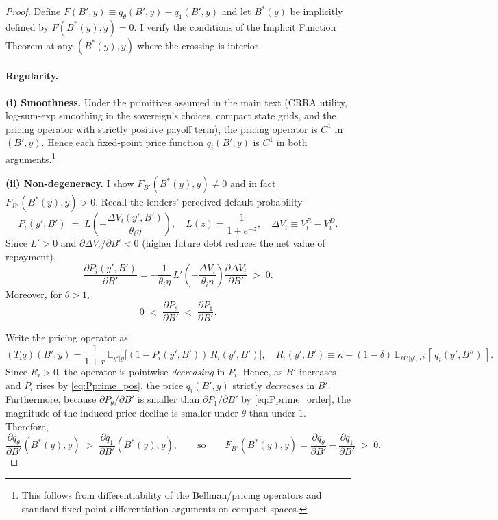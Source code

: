 \documentclass[12pt]{article}
\theoremstyle{plain}
\newcommand{\E}{\mathbb{E}}
\begin{document}
\begin{proof}
	Define \(F(B',y)\equiv q_\theta(B',y)-q_1(B',y)\) and let \(B^*(y)\) be implicitly defined by \(F(B^*(y),y)=0\).
	I verify the conditions of the Implicit Function Theorem at any \((B^*(y),y)\) where the crossing is interior.

	\paragraph{Regularity.}
	\textbf{(i) Smoothness.} Under the primitives assumed in the main text (CRRA utility, log-sum-exp smoothing in the sovereign’s choices, compact state grids, and the pricing operator with strictly positive payoff term), the pricing operator is \(C^1\) in \((B',y)\). Hence each fixed-point price function \(q_i(B',y)\) is \(C^1\) in both arguments.\footnote{This follows from differentiability of the Bellman/pricing operators and standard fixed-point differentiation arguments on compact spaces.}

\textbf{(ii) Non-degeneracy.} I show \(F_{B'}(B^*(y),y)\neq 0\) and in fact \(F_{B'}(B^*(y),y)>0\).
	Recall the lenders’ perceived default probability
	\[
		P_i(y',B') \;=\; L\!\left(-\frac{\Delta V_i(y',B')}{\theta_i\eta}\right),
		\quad L(z)=\frac{1}{1+e^{-z}},\quad
		\Delta V_i \equiv V_i^R - V_i^D.
	\]
	Since \(L'>0\) and \(\partial\Delta V_i/\partial B' < 0\) (higher future debt
	reduces the net value of repayment),
	\begin{equation}
		\frac{\partial P_i(y',B')}{\partial B'}
		= -\frac{1}{\theta_i\eta}\,L'\!\left(-\frac{\Delta V_i}{\theta_i\eta}\right)\frac{\partial \Delta V_i}{\partial B'} \;>\; 0.
		\label{eq:Pprime_pos}
	\end{equation}
	Moreover, for \(\theta>1\),
	\begin{equation}
		0 \;<\; \frac{\partial P_\theta}{\partial B'} \;<\; \frac{\partial P_1}{\partial B'}.
		\label{eq:Pprime_order}
	\end{equation}

	Write the pricing operator as
	\[
		(T_i q)(B',y)=\frac{1}{1+r}\,\E_{y'|y}\!\Big[(1-P_i(y',B'))\,R_i(y',B')\Big],\quad
		R_i(y',B')\equiv \kappa+(1-\delta)\,\E_{B''|y',B'}[\,q_i(y',B'')\,].
	\]
	Since \(R_i>0\), the operator is pointwise \emph{decreasing} in \(P_i\). Hence,
	as \(B'\) increases and \(P_i\) rises by \eqref{eq:Pprime_pos}, the price
	\(q_i(B',y)\) strictly \emph{decreases} in \(B'\). Furthermore, because
	\(\partial P_\theta/\partial B'\) is smaller than \(\partial P_1/\partial B'\)
	by \eqref{eq:Pprime_order}, the magnitude of the induced price decline is
	smaller under \(\theta\) than under \(1\). Therefore,
	\begin{equation}
		\frac{\partial q_\theta}{\partial B'}(B^*(y),y)\;>\;\frac{\partial q_1}{\partial B'}(B^*(y),y),
		\qquad\text{so}\qquad
		F_{B'}(B^*(y),y)=\frac{\partial q_\theta}{\partial B'}-\frac{\partial q_1}{\partial B'}\;>\;0.
		\label{eq:denominator_sign_correct}
	\end{equation}


\end{proof}
\end{document}
